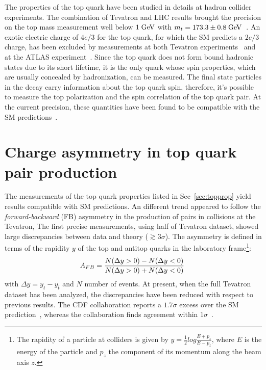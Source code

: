 The properties of the top quark have been studied in details at hadron
collider experiments. The combination of Tevatron and LHC results
brought the precision on the top mass measurement well below $1 \; \mathrm{GeV}{}$
with $m_t=173.3\pm{}0.8 \; \mathrm{GeV}{}$~\cite{topmass}.
An exotic electric charge of $4e/3$ for the top quark, for which the
SM predicts a $2e/3$ charge, has been excluded by measurements at both
Tevatron experiments~\cite{Abazov:2006vd,Aaltonen:2010js} and at the
ATLAS experiment~\cite{Aad:2013uza}.
Since the top quark does not form bound hadronic states due to its
short lifetime, it is the only quark whose spin properties, which are usually
concealed by hadronization, can be measured. The final state
particles in the decay carry information about the top quark spin,
therefore, it's possible to measure the top polarization and the spin
correlation of the top quark pair. At the current precision, these
quantities have been found to be compatible with the SM
predictions~\cite{Aad:2013ksa,Aad:2014pwa,Chatrchyan:2013wua}. 

\section{Charge asymmetry in top quark pair production}
\label{sec:topca}

The measurements of the top quark properties listed in
Sec~\ref{sec:topprop} yield results compatible with SM predictions.
An different trend appeared to follow the {\it forward-backward}
(FB) asymmetry in the production of \ttbar{} pairs in \ppbar{}
collisions at the Tevatron, The first precise measurements, using half
of Tevatron dataset, showed large discrepancies between
data and theory ($\gtrsim 3\sigma$). 
The asymmetry \afb{} is defined in terms of the rapidity $y$ of the top and
antitop quarks in the laboratory frame\footnote{The rapidity of a
  particle at colliders is given by $y=\frac{1}{2}log\frac{E+p_z}{E-p_z}$, where
  $E$ is the energy of the particle and $p_z$ the component of its
  momentum along the beam axis $z$.}: 
\begin{equation}
\label{eq:afb}
\mbox{$A_{FB}$}{}=\frac{N(\Delta{}y>0)-N(\Delta{}y<0)}{N(\Delta{}y>0)+N(\Delta{}y<0)}
\phantom{,}
\end{equation}
with $\Delta{}y=y_t - y_{\bar{t}}$ and $N$ number of events.
At present, when the full Tevatron dataset has been analyzed, the
discrepancies have been reduced with respect to previous results. The
CDF collaboration reports a $1.7\sigma$ excess over the SM
prediction~\cite{Aaltonen:2012it}, whereas the \dzero{} collaboration
finds agreement within $1\sigma$~\cite{Abazov:2014cca}.

